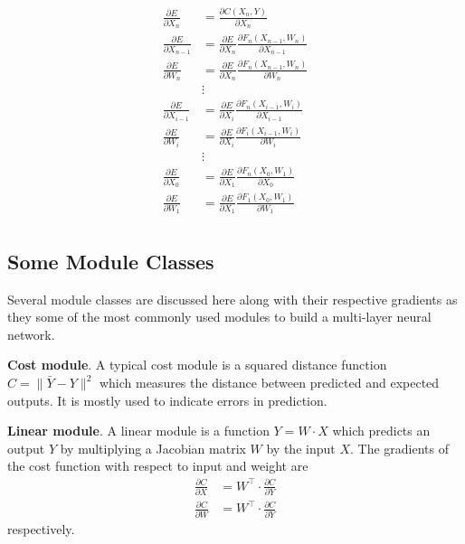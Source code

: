 \begin{align*}
 \frac{\partial E}{\partial X_n} &= \frac{\partial C(X_n, Y)}{\partial X_n}\\
 \frac{\partial E}{\partial X_{n-1}} &=\frac{\partial E}{\partial X_n} \frac{\partial F_n(X_{n-1},W_n)}{\partial X_{n-1}} \\  
 \frac{\partial E}{\partial W_n} &=\frac{\partial E}{\partial X_n} \frac{\partial F_n(X_{n-1},W_n)}{\partial W_n} \\
 &\vdots\\ 
 \frac{\partial E}{\partial X_{i-1}} &=\frac{\partial E}{\partial X_i} \frac{\partial F_n(X_{i-1},W_i)}{\partial X_{i-1}} \\  
 \frac{\partial E}{\partial W_i} &=\frac{\partial E}{\partial X_i} \frac{\partial F_i(X_{i-1},W_i)}{\partial W_i} \\
   &\vdots\\ 
 \frac{\partial E}{\partial X_0} &=\frac{\partial E}{\partial X_1} \frac{\partial F_n(X_0,W_1)}{\partial X_0} \\  
 \frac{\partial E}{\partial W_1} &=\frac{\partial E}{\partial X_1} \frac{\partial F_1(X_0,W_1)}{\partial W_1} \\
\end{align*}

\subsection{Some Module Classes}\label{ssc:Module Classes}

Several module classes are discussed here along with their respective gradients as they some of the most commonly used modules to build a multi-layer neural network.

\textbf{Cost module}.
A typical cost module is a squared distance function $C=\|\bar{Y}-Y\|^2$ which measures the distance between predicted and expected outputs.
It is mostly used to indicate errors in prediction.

\textbf{Linear module}.
A linear module is a function $Y=W\cdot X$ which predicts an output $Y$ by multiplying a Jacobian matrix $W$ by the input $X$.
The gradients of the cost function with respect to input and weight are 
\begin{align*}
    \frac{\partial C}{\partial X} &= W^\top \cdot \frac{\partial C}{\partial Y} \\
    \frac{\partial C}{\partial W} &= W^\top \cdot \frac{\partial C}{\partial Y} 
\end{align*}
respectively.

